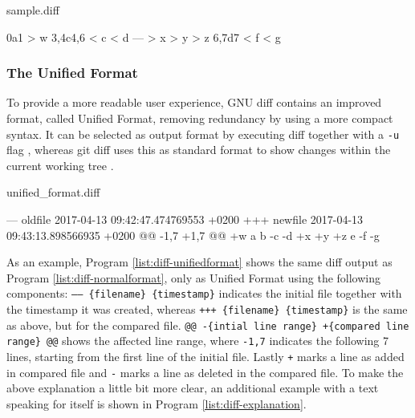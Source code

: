 \label{sec:diff-technology}
\begin{program}
  \caption{sample.diff}
  \label{list:diff-normalformat}
  \begin{GenericCode}
  0a1
  > w
  3,4c4,6
  < c
  < d
  ---
  > x
  > y
  > z
  6,7d7
  < f
  < g
  \end{GenericCode}
\end{program}


\subsubsection{The Unified Format}
To provide a more readable user experience, GNU diff contains an improved format, called Unified Format, removing redundancy by using a more compact syntax. It can be selected as output format by executing diff together with a \texttt{-u} flag \cite[16]{mackenzie2003comparing}, whereas git diff uses this as standard format to show changes within the current working tree \cite{GitDiff}.

\begin{program}
  \caption{unified\_format.diff}
  \label{list:diff-unifiedformat}
  \begin{GenericCode}
  --- oldfile	2017-04-13 09:42:47.474769553 +0200
  +++ newfile	2017-04-13 09:43:13.898566935 +0200
  @@ -1,7 +1,7 @@
  +w
   a
   b
  -c
  -d
  +x
  +y
  +z
   e
  -f
  -g
  \end{GenericCode}
\end{program}

As an example, Program \ref{list:diff-unifiedformat} shows the same diff output as Program \ref{list:diff-normalformat}, only as Unified Format using the following components: \texttt{------ \{filename\} \{timestamp\}} indicates the initial file together with the timestamp it was created, whereas \texttt{+++ \{filename\} \{timestamp\}} is the same as above, but for the compared file.
\texttt{@@ -\{intial line range\} +\{compared line range\} @@} shows the affected line range, where \texttt{-1,7} indicates the following 7 lines, starting from the first line of the initial file. Lastly \texttt{+} marks a line as added in compared file and \texttt{-} marks a line as deleted in the compared file. To make the above explanation a little bit more clear, an additional example with a text speaking for itself is shown in Program \ref{list:diff-explanation}.

